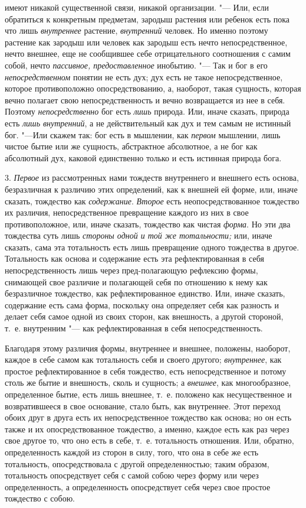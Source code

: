 имеют никакой существенной связи, никакой организации. "--- Или, если
обратиться к конкретным предметам, зародыш растения или ребенок есть пока
что лишь {\em внутреннее} растение,
{\em внутренний} человек. Но именно поэтому растение
как зародыш или человек как зародыш есть нечто непосредственное, нечто
внешнее, еще не сообщившее себе отрицательного соотношения с самим собой,
нечто {\em пассивное, предоставленное} инобытию. "--- Так
и бог в его {\em непосредственном} понятии не есть дух;
дух есть не такое непосредственное, которое противоположно
опосредствованию, а, наоборот, такая сущность, которая вечно полагает свою
непосредственность и вечно возвращается из нее в себя. Поэтому
{\em непосредственно} бог есть
{\em лишь} природа. Или, иначе сказать, природа есть
{\em лишь внутренний}, а не действительный как дух и
тем самым не истинный бог. "---Или скажем так: бог есть в мышлении, как
{\em первом} мышлении, лишь чистое бытие или же
сущность, абстрактное абсолютное, а не бог как абсолютный дух, каковой
единственно только и есть истинная природа бога.

3. {\em Первое} из рассмотренных нами тождеств
внутреннего и внешнего есть основа, безразличная к различию этих
определений, как к внешней ей форме, или, иначе сказать, тождество как
{\em содержание}. {\em Второе} есть
неопосредствованное тождество их различия, непосредственное превращение
каждого из них в свое противоположное, или, иначе сказать, тождество как
чистая {\em форма}. Но эти два тождества суть лишь
{\em стороны одной и той же тотальности;} или, иначе
сказать, сама эта тотальность есть лишь превращение одного тождества в
другое. Тотальность как основа и содержание есть эта рефлектированная в
себя непосредственность лишь через пред-полагающую рефлексию формы,
снимающей свое различие и полагающей себя по отношению к нему как
безразличное тождество, как рефлектированное единство. Или, иначе сказать,
содержание есть сама форма, поскольку она определяет себя как разность и
делает себя самое одной из своих сторон, как внешность, а другой стороной,
т.~е. внутренним "--- как рефлектированная в себя непосредственность.

Благодаря этому различия формы, внутреннее и внешнее, положены, наоборот,
каждое в себе самом как тотальность себя и своего другого;
{\em внутреннее}, как простое рефлектированное в себя
тождество, есть непосредственное и потому столь же бытие и внешность, сколь
и сущность; а {\em внешнее}, как многообразное,
определенное бытие, есть лишь внешнее, т.~е. положено как несущественное и
возвратившееся в свое основание, стало быть, как внутреннее. Этот переход
обоих друг в друга есть их непосредственное тождество как основа; но он
есть также и их опосредствованное тождество, а именно, каждое есть как раз
через свое другое то, что оно есть в себе, т.~е. тотальность отношения.
Или, обратно, определенность каждой из сторон в силу, того, что она в себе
же есть тотальность, опосредствовала с другой определенностью; таким
образом, тотальность опосредствует себя с самой собою через форму или через
определенность, а определенность опосредствует себя через свое простое
тождество с собою.

